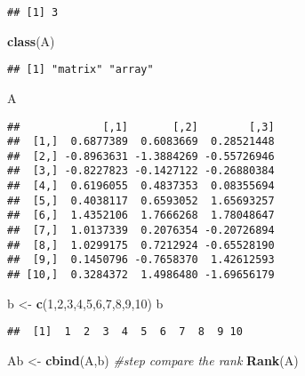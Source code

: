 \documentclass[
]{article}
\newenvironment{Shaded}{\begin{snugshade}}{\end{snugshade}}
\newcommand{\CommentTok}[1]{\textcolor[rgb]{0.56,0.35,0.01}{\textit{#1}}}
\newcommand{\DecValTok}[1]{\textcolor[rgb]{0.00,0.00,0.81}{#1}}
\newcommand{\FunctionTok}[1]{\textcolor[rgb]{0.13,0.29,0.53}{\textbf{#1}}}
\newcommand{\NormalTok}[1]{#1}
\newcommand{\OtherTok}[1]{\textcolor[rgb]{0.56,0.35,0.01}{#1}}
\begin{document}
\begin{verbatim}
## [1] 3
\end{verbatim}

\begin{Shaded}
\begin{Highlighting}[]
\FunctionTok{class}\NormalTok{(A)}
\end{Highlighting}
\end{Shaded}

\begin{verbatim}
## [1] "matrix" "array"
\end{verbatim}

\begin{Shaded}
\begin{Highlighting}[]
\NormalTok{A}
\end{Highlighting}
\end{Shaded}

\begin{verbatim}
##             [,1]       [,2]        [,3]
##  [1,]  0.6877389  0.6083669  0.28521448
##  [2,] -0.8963631 -1.3884269 -0.55726946
##  [3,] -0.8227823 -0.1427122 -0.26880384
##  [4,]  0.6196055  0.4837353  0.08355694
##  [5,]  0.4038117  0.6593052  1.65693257
##  [6,]  1.4352106  1.7666268  1.78048647
##  [7,]  1.0137339  0.2076354 -0.20726894
##  [8,]  1.0299175  0.7212924 -0.65528190
##  [9,]  0.1450796 -0.7658370  1.42612593
## [10,]  0.3284372  1.4986480 -1.69656179
\end{verbatim}

\begin{Shaded}
\begin{Highlighting}[]
\NormalTok{b }\OtherTok{\textless{}{-}} \FunctionTok{c}\NormalTok{(}\DecValTok{1}\NormalTok{,}\DecValTok{2}\NormalTok{,}\DecValTok{3}\NormalTok{,}\DecValTok{4}\NormalTok{,}\DecValTok{5}\NormalTok{,}\DecValTok{6}\NormalTok{,}\DecValTok{7}\NormalTok{,}\DecValTok{8}\NormalTok{,}\DecValTok{9}\NormalTok{,}\DecValTok{10}\NormalTok{)}
\NormalTok{b}
\end{Highlighting}
\end{Shaded}

\begin{verbatim}
##  [1]  1  2  3  4  5  6  7  8  9 10
\end{verbatim}

\begin{Shaded}
\begin{Highlighting}[]
\NormalTok{Ab }\OtherTok{\textless{}{-}} \FunctionTok{cbind}\NormalTok{(A,b)}
\CommentTok{\#step compare the rank}
\FunctionTok{Rank}\NormalTok{(A)}
\end{Highlighting}
\end{Shaded}
\end{document}
